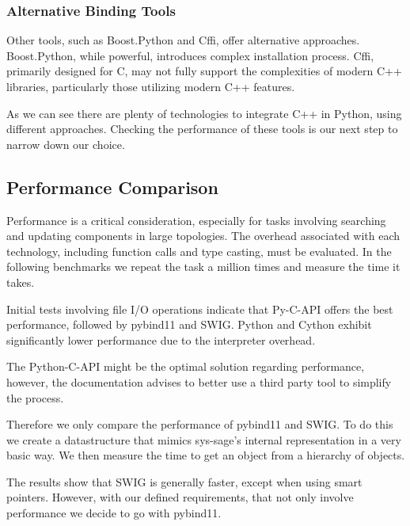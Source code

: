 \subsubsection{Alternative Binding Tools}

Other tools, such as Boost.Python and Cffi, offer alternative approaches. Boost.Python, while powerful, introduces complex installation process. Cffi, primarily designed for C, may not fully support the complexities of modern C++ libraries, particularly those utilizing modern C++ features. \cite{boost-docu} \cite{cffi-docu}

As we can see there are plenty of technologies to integrate C++ in Python, using different approaches. Checking the performance of these tools is our next step to narrow down our choice.

\subsection{Performance Comparison}

Performance is a critical consideration, especially for tasks involving searching and updating components in large topologies. The overhead associated with each technology, including function calls and type casting, must be evaluated. In the following benchmarks we repeat the task a million times and measure the time it takes.

Initial tests involving file I/O operations indicate that Py-C-API offers the best performance, followed by pybind11 and SWIG. Python and Cython exhibit significantly lower performance due to the interpreter overhead.



The Python-C-API might be the optimal solution regarding performance, however, the documentation advises to better use a third party tool to simplify the process. \cite{py-c-api}

Therefore we only compare the performance of pybind11 and SWIG. To do this we create a datastructure that mimics sys-sage's internal representation in a very basic way. We then measure the time to get an object from a hierarchy of objects. 






The results show that SWIG is generally faster, except when using smart pointers. However, with our defined requirements, that not only involve performance we decide to go with pybind11.


